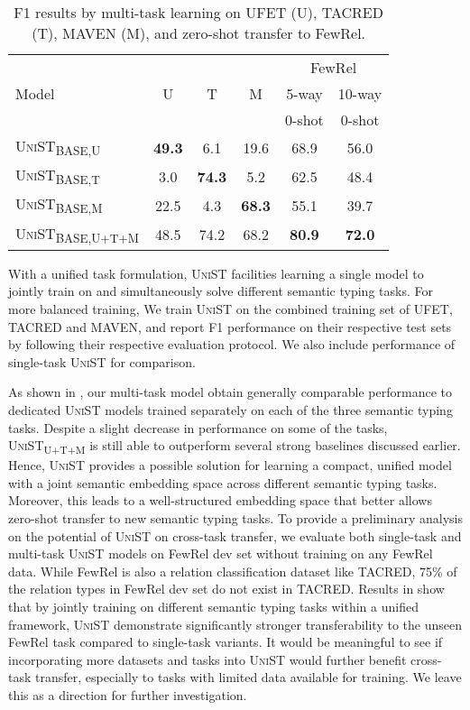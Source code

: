 \documentclass[11pt]{article}
\newcommand{\model}{\textsc{UniST}\xspace}
\newcommand{\basemodel}{\textsc{UniST}\textsubscript{BASE}}
\newcommand{\multimodel}{\textsc{UniST}\textsubscript{U+T+M}}
\begin{document}
\begin{table}[t]
    \centering
    \small
    \setlength{\tabcolsep}{4pt}
    \begin{tabular}{l|ccc|cc}
        \toprule
        \multirow{3}{*}{Model} & \multirow{3}{*}{U} & \multirow{3}{*}{T} & \multirow{3}{*}{M} & \multicolumn{2}{c}{FewRel} \\
        & & & & 5-way & 10-way \\
        & & & & 0-shot & 0-shot \\
        \midrule
        \basemodel\textsubscript{,U} & \textbf{49.3} & 6.1 & 19.6 & 68.9 & 56.0 \\
        \basemodel\textsubscript{,T} & 3.0 & \textbf{74.3} & 5.2 & 62.5 & 48.4 \\
        \basemodel\textsubscript{,M} & 22.5 & 4.3 & \textbf{68.3} & 55.1 & 39.7 \\
        \midrule
        \basemodel\textsubscript{,U+T+M} & 48.5 & 74.2 & 68.2 & \textbf{80.9} & \textbf{72.0} \\
        \bottomrule
    \end{tabular}
\caption{F1 results by multi-task learning on UFET (U), TACRED (T), MAVEN (M), and zero-shot transfer to FewRel.}
    \label{tab:multitask}
\end{table} 
With a unified task formulation, \model facilities learning a single model to jointly train on and simultaneously solve different semantic typing tasks. For more balanced training, We train \model on the combined training set of UFET, TACRED and MAVEN, and report F1 performance on their respective test sets by following their respective evaluation protocol. We also include performance of single-task \model for comparison.

As shown in , our multi-task model  obtain generally comparable performance to dedicated \model models trained separately on each of the three semantic typing tasks. Despite a slight decrease in performance on some of the tasks, \multimodel\xspace is still able to outperform several strong baselines discussed earlier. Hence, \model provides a possible solution for learning a compact, unified model with a joint semantic embedding space across different semantic typing tasks. Moreover, this leads to a well-structured embedding space that better allows zero-shot transfer to new semantic typing tasks. To provide a preliminary analysis on the potential of \model on cross-task transfer, we evaluate both single-task and multi-task \model models on FewRel dev set without training on any FewRel data. While FewRel is also a relation classification dataset like TACRED, 75\% of the relation types in FewRel dev set do not exist in TACRED. Results in  show that by jointly training on different semantic typing tasks within a unified framework, \model demonstrate significantly stronger transferability to the unseen FewRel task compared to single-task variants. It would be meaningful to see if incorporating more datasets and tasks into \model would further benefit cross-task transfer, especially to tasks with limited data available for training. We leave this as a direction for further investigation. 
\end{document}
